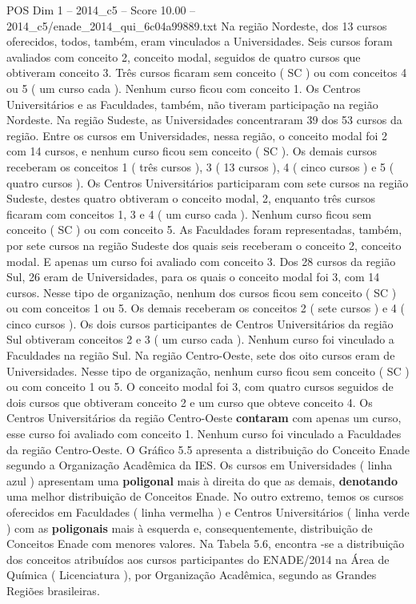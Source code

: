 \begin{textsample}{POS Dim 1 – 2014\_c5 – Score 10.00 – 2014\_c5/enade\_2014\_qui\_6c04a99889.txt}
Na região Nordeste, dos 13 cursos oferecidos, todos, também, eram vinculados a Universidades.
Seis cursos foram avaliados com conceito 2, conceito modal, seguidos de quatro cursos que obtiveram conceito 3.
Três cursos ficaram sem conceito ( SC ) ou com conceitos 4 ou 5 ( um curso cada ).
Nenhum curso ficou com conceito 1.
Os Centros Universitários e as Faculdades, também, não tiveram participação na região Nordeste.
Na região Sudeste, as Universidades concentraram 39 dos 53 cursos da região.
Entre os cursos em Universidades, nessa região, o conceito modal foi 2 com 14 cursos, e nenhum curso ficou sem conceito ( SC ).
Os demais cursos receberam os conceitos 1 ( três cursos ), 3 ( 13 cursos ), 4 ( cinco cursos ) e 5 ( quatro cursos ).
Os Centros Universitários participaram com sete cursos na região Sudeste, destes quatro obtiveram o conceito modal, 2, enquanto três cursos ficaram com conceitos 1, 3 e 4 ( um curso cada ).
Nenhum curso ficou sem conceito ( SC ) ou com conceito 5.
As Faculdades foram representadas, também, por sete cursos na região Sudeste dos quais seis receberam o conceito 2, conceito modal.
E apenas um curso foi avaliado com conceito 3.
Dos 28 cursos da região Sul, 26 eram de Universidades, para os quais o conceito modal foi 3, com 14 cursos.
Nesse tipo de organização, nenhum dos cursos ficou sem conceito ( SC ) ou com conceitos 1 ou 5.
Os demais receberam os conceitos 2 ( sete cursos ) e 4 ( cinco cursos ).
Os dois cursos participantes de Centros Universitários da região Sul obtiveram conceitos 2 e 3 ( um curso cada ).
Nenhum curso foi vinculado a Faculdades na região Sul.
Na região Centro-Oeste, sete dos oito cursos eram de Universidades.
Nesse tipo de organização, nenhum curso ficou sem conceito ( SC ) ou com conceito 1 ou 5.
O conceito modal foi 3, com quatro cursos seguidos de dois cursos que obtiveram conceito 2 e um curso que obteve conceito 4.
Os Centros Universitários da região Centro-Oeste \textbf{contaram} com apenas um curso, esse curso foi avaliado com conceito 1.
Nenhum curso foi vinculado a Faculdades da região Centro-Oeste.
O Gráfico 5.5 apresenta a distribuição do Conceito Enade segundo a Organização Acadêmica da IES.
Os cursos em Universidades ( linha azul ) apresentam uma \textbf{poligonal} mais à direita do que as demais, \textbf{denotando} uma melhor distribuição de Conceitos Enade.
No outro extremo, temos os cursos oferecidos em Faculdades ( linha vermelha ) e Centros Universitários ( linha verde ) com as \textbf{poligonais} mais à esquerda e, consequentemente, distribuição de Conceitos Enade com menores valores.
Na Tabela 5.6, encontra -se a distribuição dos conceitos atribuídos aos cursos participantes do ENADE/2014 na Área de Química ( Licenciatura ), por Organização Acadêmica, segundo as Grandes Regiões brasileiras.

\end{textsample}
